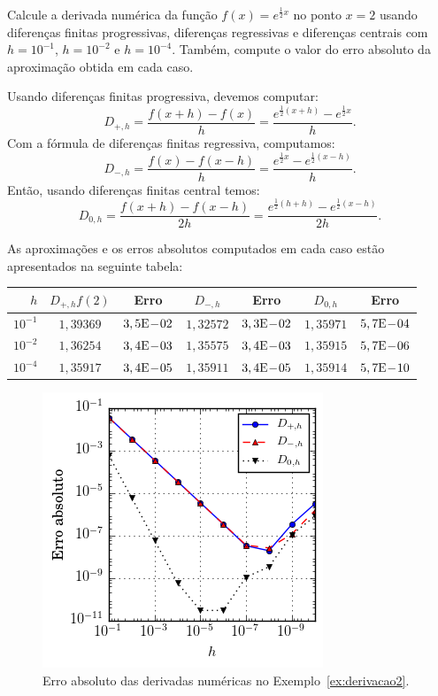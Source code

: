 \begin{ex}\label{ex:derivacao2}
Calcule a derivada numérica da função $f(x)=e^{\frac{1}{2}x}$ no ponto $x=2$ usando diferenças finitas progressivas, diferenças regressivas e diferenças centrais com $h=10^{-1}$, $h=10^{-2}$ e $h=10^{-4}$. Também, compute o valor do erro absoluto da aproximação obtida em cada caso.
\end{ex}
\begin{sol}
  Usando diferenças finitas progressiva, devemos computar:
  \begin{equation*}
    D_{+,h} = \frac{f(x+h) - f(x)}{h} = \frac{e^{\frac{1}{2}(x+h)} - e^{\frac{1}{2}x}}{h}.
  \end{equation*}
  Com a fórmula de diferenças finitas regressiva, computamos:
  \begin{equation*}
    D_{-,h} = \frac{f(x) - f(x-h)}{h} = \frac{e^{\frac{1}{2}x} - e^{\frac{1}{2}(x-h)}}{h}.
  \end{equation*}
  Então, usando diferenças finitas central temos:
  \begin{equation*}
    D_{0,h} = \frac{f(x+h) - f(x-h)}{2h} = \frac{e^{\frac{1}{2}(h+h)} - e^{\frac{1}{2}(x-h)}}{2h}.
  \end{equation*}

  As aproximações e os erros absolutos computados em cada caso estão apresentados na seguinte tabela:
  \begin{center}
    \begin{tabular}{r|cc|cc|cc}
      $h$  & $D_{+,h}f(2)$ & Erro & $D_{-,h}$ & Erro & $D_{0,h}$ & Erro \\\hline
      $10^{-1}$ & $1,39369$ & $3,5\mathrm{E}\!-\!02$   & $1,32572$ & $3,3\mathrm{E}\!-\!02$ & $1,35971$ & $5,7\mathrm{E}\!-\!04$\\
      $10^{-2}$ & $1,36254$ & $3,4\mathrm{E}\!-\!03$   & $1,35575$ & $3,4\mathrm{E}\!-\!03$ & $1,35915$ & $5,7\mathrm{E}\!-\!06$\\
      $10^{-4}$ & $1,35917$ & $3,4\mathrm{E}\!-\!05$   & $1,35911$ & $3,4\mathrm{E}\!-\!05$ & $1,35914$ & $5,7\mathrm{E}\!-\!10$\\\hline
    \end{tabular}
  \end{center}
\end{sol}

\begin{figure}
  \centering
  \includegraphics{./cap_derivacao/pics/ex_derivacao2/ex_derivacao2}
  \caption{Erro absoluto das derivadas numéricas no Exemplo~\ref{ex:derivacao2}.}
  \label{fig:ex_derivacao2}
\end{figure}


